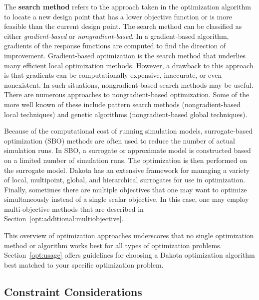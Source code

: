 The {\bf search method} refers to the approach taken in the
optimization algorithm to locate a new design point that has a lower
objective function or is more feasible than the current design point.
The search method can be classified as either \emph{gradient-based} or
\emph{nongradient-based}. In a gradient-based algorithm, gradients of
the response functions are computed to find the direction of
improvement. Gradient-based optimization is the search method that
underlies many efficient local optimization methods. However, a
drawback to this approach is that gradients can be computationally
expensive, inaccurate, or even nonexistent. In such situations,
nongradient-based search methods may be useful. There are numerous
approaches to nongradient-based optimization. Some of the more well
known of these include pattern search methods (nongradient-based local
techniques) and genetic algorithms (nongradient-based global
techniques). 

Because of the computational cost of running simulation
models, surrogate-based optimization (SBO) methods are often used to
reduce the number of actual simulation runs. In SBO, a surrogate or
approximate model is constructed based on a limited number of
simulation runs. The optimization is then performed on the surrogate
model. Dakota has an extensive framework for managing a variety of
local, multipoint, global, and hierarchical surrogates for use in
optimization. Finally, sometimes there are multiple objectives that 
one may want to optimize simultaneously instead of a single scalar 
objective.  In this case, one may employ multi-objective methods 
that are described in Section~\ref{opt:additional:multiobjective}.

This overview of optimization approaches underscores that no single
optimization method or algorithm works best for all types of
optimization problems. Section~\ref{opt:usage} offers guidelines for
choosing a Dakota optimization algorithm best matched to your specific
optimization problem.

\subsection{Constraint Considerations}
\label{opt:formulations:constraints}

